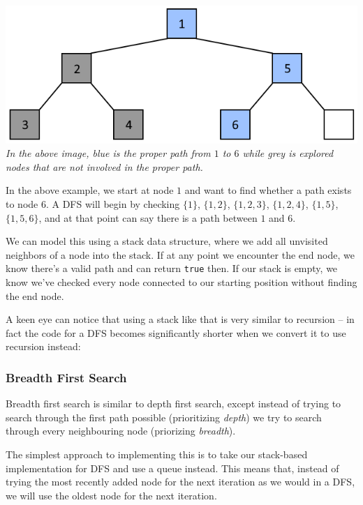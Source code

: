 {\centering \includegraphics[width=\textwidth]{images/graph/dfs.png}}
\textit{In the above image, blue is the proper path from $1$ to $6$ while grey is explored nodes that are not involved in the proper path.}

In the above example, we start at node $1$ and want to find whether a path exists to node $6$. A DFS will begin by checking $\{1\}$, $\{1, 2\}$, $\{1, 2, 3\}$, $\{1, 2, 4\}$, $\{1, 5\}$, $\{1, 5, 6\}$, and at that point can say there is a path between $1$ and $6$. 

We can model this using a stack data structure, where we add all unvisited neighbors of a node into the stack. If at any point we encounter the end node, we know there's a valid path and can return \texttt{true} then. If our stack is empty, we know we've checked every node connected to our starting position without finding the end node.


A keen eye can notice that using a stack like that is very similar to recursion -- in fact the code for a DFS becomes significantly shorter when we convert it to use recursion instead:


\subsubsection{Breadth First Search}

Breadth first search is similar to depth first search, except instead of trying to search through the first path possible (prioritizing \textit{depth}) we try to search through every neighbouring node (priorizing \textit{breadth}).

The simplest approach to implementing this is to take our stack-based implementation for DFS and use a queue instead. This means that, instead of trying the most recently added node for the next iteration as we would in a DFS, we will use the oldest node for the next iteration.

